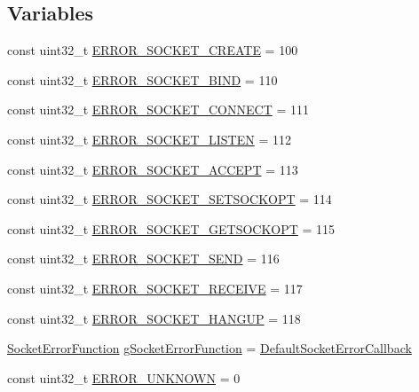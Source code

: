 \subsection*{Variables}
\begin{DoxyCompactItemize}
\item 
const uint32\+\_\+t \hyperlink{namespacetnnf_a51be82cdfdf6eff814be2e34de56a9a1}{E\+R\+R\+O\+R\+\_\+\+S\+O\+C\+K\+E\+T\+\_\+\+C\+R\+E\+A\+T\+E} = 100
\item 
const uint32\+\_\+t \hyperlink{namespacetnnf_add560b64e8aecd3281b3c91a0d16d362}{E\+R\+R\+O\+R\+\_\+\+S\+O\+C\+K\+E\+T\+\_\+\+B\+I\+N\+D} = 110
\item 
const uint32\+\_\+t \hyperlink{namespacetnnf_aba852bd058879ae114c4a193dae288ba}{E\+R\+R\+O\+R\+\_\+\+S\+O\+C\+K\+E\+T\+\_\+\+C\+O\+N\+N\+E\+C\+T} = 111
\item 
const uint32\+\_\+t \hyperlink{namespacetnnf_a3faa5f965d97387038d335b38db45285}{E\+R\+R\+O\+R\+\_\+\+S\+O\+C\+K\+E\+T\+\_\+\+L\+I\+S\+T\+E\+N} = 112
\item 
const uint32\+\_\+t \hyperlink{namespacetnnf_afe273a345b20de223f7e6201d9660fb8}{E\+R\+R\+O\+R\+\_\+\+S\+O\+C\+K\+E\+T\+\_\+\+A\+C\+C\+E\+P\+T} = 113
\item 
const uint32\+\_\+t \hyperlink{namespacetnnf_ae28f1ae6799377f7d7c40bd752c1a8ca}{E\+R\+R\+O\+R\+\_\+\+S\+O\+C\+K\+E\+T\+\_\+\+S\+E\+T\+S\+O\+C\+K\+O\+P\+T} = 114
\item 
const uint32\+\_\+t \hyperlink{namespacetnnf_a6cec59383f83c86885d8f8681106d003}{E\+R\+R\+O\+R\+\_\+\+S\+O\+C\+K\+E\+T\+\_\+\+G\+E\+T\+S\+O\+C\+K\+O\+P\+T} = 115
\item 
const uint32\+\_\+t \hyperlink{namespacetnnf_a55b8e5d6612e2ab58109761946028ed6}{E\+R\+R\+O\+R\+\_\+\+S\+O\+C\+K\+E\+T\+\_\+\+S\+E\+N\+D} = 116
\item 
const uint32\+\_\+t \hyperlink{namespacetnnf_a3e5567624ad53b0da7c9bd2e8fa0f3eb}{E\+R\+R\+O\+R\+\_\+\+S\+O\+C\+K\+E\+T\+\_\+\+R\+E\+C\+E\+I\+V\+E} = 117
\item 
const uint32\+\_\+t \hyperlink{namespacetnnf_a0d1722c8223224a7453b2d66b8982af0}{E\+R\+R\+O\+R\+\_\+\+S\+O\+C\+K\+E\+T\+\_\+\+H\+A\+N\+G\+U\+P} = 118
\item 
\hyperlink{namespacetnnf_ab346f9859b3d467cfa2b596cc075e954}{Socket\+Error\+Function} \hyperlink{namespacetnnf_a802200ba988ad42ccc91044d5f95d24e}{g\+Socket\+Error\+Function} = \hyperlink{namespacetnnf_a21142ebedd6a5be7bfffd23787de2938}{Default\+Socket\+Error\+Callback}
\item 
const uint32\+\_\+t \hyperlink{namespacetnnf_a754e3b1ba0068cba6479b08b2ebec56c}{E\+R\+R\+O\+R\+\_\+\+U\+N\+K\+N\+O\+W\+N} = 0

\end{DoxyCompactItemize}
